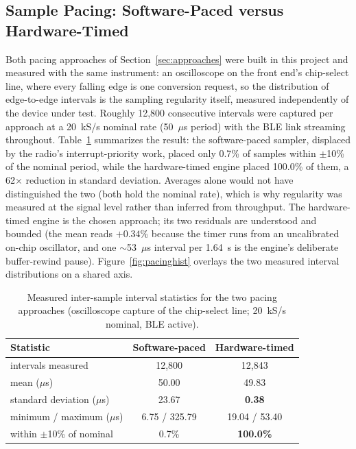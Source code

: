 \documentclass[11pt]{article}
\begin{document}
\subsection{Sample Pacing: Software-Paced versus Hardware-Timed}
Both pacing approaches of Section~\ref{sec:approaches} were built in this project and measured with the
same instrument: an oscilloscope on the front end's chip-select line, where every falling
edge is one conversion request, so the distribution of edge-to-edge intervals is the
sampling regularity itself, measured independently of the device under test. Roughly
12{,}800 consecutive intervals were captured per approach at a 20~kS/s nominal rate
(50~$\mu$s period) with the BLE link streaming throughout. Table~\ref{tab:pacing}
summarizes the result: the software-paced sampler, displaced by the radio's
interrupt-priority work, placed only 0.7\% of samples within $\pm$10\% of the nominal
period, while the hardware-timed engine placed 100.0\% of them, a 62$\times$ reduction
in standard deviation. Averages alone would not have distinguished the two (both hold
the nominal rate), which is why regularity was measured at the signal level rather than
inferred from throughput. The hardware-timed engine is the chosen approach; its two
residuals are understood and bounded (the mean reads $+0.34$\% because the timer runs
from an uncalibrated on-chip oscillator, and one $\sim$53~$\mu$s interval per 1.64~s is
the engine's deliberate buffer-rewind pause). Figure~\ref{fig:pacinghist} overlays the
two measured interval distributions on a shared axis.

\begin{table}[H]
\centering
\caption{Measured inter-sample interval statistics for the two pacing approaches
(oscilloscope capture of the chip-select line; 20~kS/s nominal, BLE active).}
\label{tab:pacing}
{\footnotesize\sffamily
\setlength{\tabcolsep}{4pt}
\renewcommand{\arraystretch}{1.2}
\begin{tabular}{|l|c|c|}
\hline
\textbf{Statistic} & \textbf{Software-paced} & \textbf{Hardware-timed} \\
\hline
intervals measured            & 12{,}800 & 12{,}843 \\
\hline
mean ($\mu$s)                 & 50.00    & 49.83 \\
\hline
standard deviation ($\mu$s)   & 23.67    & \textbf{0.38} \\
\hline
minimum / maximum ($\mu$s)    & 6.75 / 325.79 & 19.04 / 53.40 \\
\hline
within $\pm$10\% of nominal   & 0.7\%    & \textbf{100.0\%} \\
\hline
\end{tabular}
}
\end{table}
\end{document}
